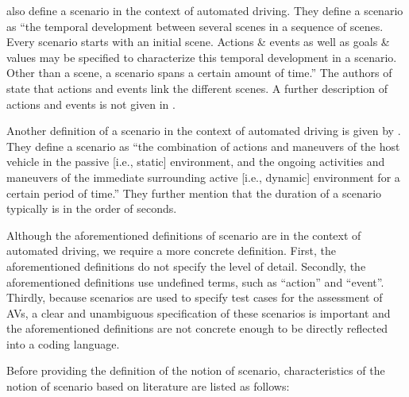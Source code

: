 \textcite{ulbrich2015} also define a scenario in the context of automated driving. They define a scenario as ``the temporal development between several scenes in a sequence of scenes. Every scenario starts with an initial scene. Actions \& events as well as goals \& values may be specified to characterize this temporal development in a scenario. Other than a scene, a scenario spans a certain amount of time.'' The authors of \cite{ulbrich2015} state that actions and events link the different scenes. A further description of actions and events is not given in \cite{ulbrich2015}.

Another definition of a scenario in the context of automated driving is given by \textcite{elrofai2016scenario}. They define a scenario as ``the combination of actions and maneuvers of the host vehicle in the passive [i.e., static] environment, and the ongoing activities and maneuvers of the immediate surrounding active [i.e., dynamic] environment for a certain period of time.'' They further mention that the duration of a scenario typically is in the order of seconds.

\cbstart
Although the aforementioned definitions of scenario \cite{geyer2014, ulbrich2015, elrofai2016scenario} are in the context of automated driving, we require a more concrete definition. First, the aforementioned definitions do not specify the level of detail. 
Secondly, the aforementioned definitions use undefined terms, such as ``action'' and ``event''. Thirdly, because scenarios are used to specify test cases for the assessment of AVs, a clear and unambiguous specification of these scenarios is important and the aforementioned definitions are not concrete enough to be directly reflected into a coding language.
\cbend


Before providing the definition of the notion of scenario, characteristics of the notion of scenario based on literature are listed as follows:

